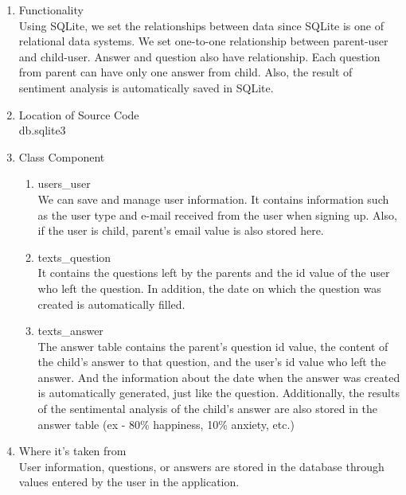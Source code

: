 \documentclass[conference]{IEEEtran}
\begin{document}
\begin{enumerate}
\begin{enumerate}
            \item Functionality
            \\Using SQLite, we set the relationships between data since SQLite is one of relational data systems. We set one-to-one relationship between parent-user and child-user. Answer and question also have relationship. Each question from parent can have only one answer from child. Also, the result of sentiment analysis is automatically saved in SQLite.
            
            \item Location of Source Code
            \\db.sqlite3
            
            \item Class Component
            \begin{enumerate}
                \item users\_user
                \\We can save and manage user information. It contains information such as the user type and e-mail received from the user when signing up. Also, if the user is child, parent's email value is also stored here.
                
                \item texts\_question
                \\It contains the questions left by the parents and the id value of the user who left the question. In addition, the date on which the question was created is automatically filled.
                
                \item texts\_answer
                \\The answer table contains the parent's question id value, the content of the child's answer to that question, and the user's id value who left the answer. And the information about the date when the answer was created is automatically generated, just like the question. Additionally, the results of the sentimental analysis of the child's answer are also stored in the answer table (ex - 80\% happiness, 10\% anxiety, etc.)       
            \end{enumerate}

            \item Where it’s taken from
            \\User information, questions, or answers are stored in the database through values entered by the user in the application.
            

\end{enumerate}
\end{enumerate}
\end{document}
